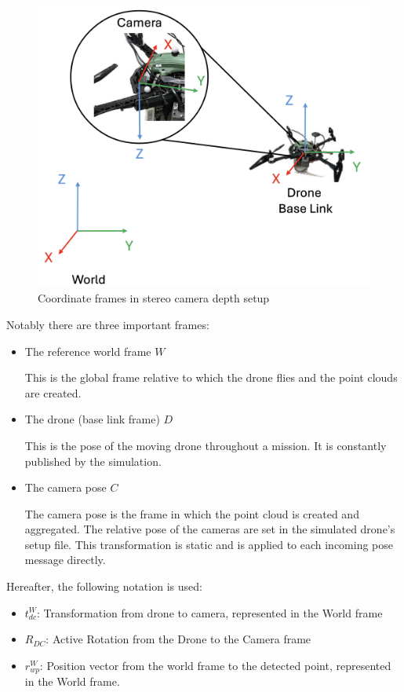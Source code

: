 \begin{figure}[h]
\centering
\includegraphics[scale=0.2]{images/stereo_camera_depth/frames.png}
\caption{Coordinate frames in stereo camera depth setup}
\label{fig:frames}
\end{figure}

Notably there are three important frames:

\begin{itemize}
    \item The reference world frame $W$

    This is the global frame relative to which the drone flies and the point clouds are created.

    \item The drone (base link frame) $D$
    
    This is the pose of the moving drone throughout a mission. It is constantly published by the simulation.

    \item The camera pose $C$
    
    The camera pose is the frame in which the point cloud is created and aggregated. The relative pose of the cameras are set in the simulated drone's setup file. This transformation is static and is applied to each incoming pose message directly.
\end{itemize}

Hereafter, the following notation is used:

\begin{itemize}
    \item $t_{dc}^W$: Transformation from drone to camera, represented in the World frame
    \item $R_{DC}$: Active Rotation from the Drone to the Camera frame
    \item $r_{wp}^W$: Position vector from the world frame to the detected point, represented in the World frame.
\end{itemize}

